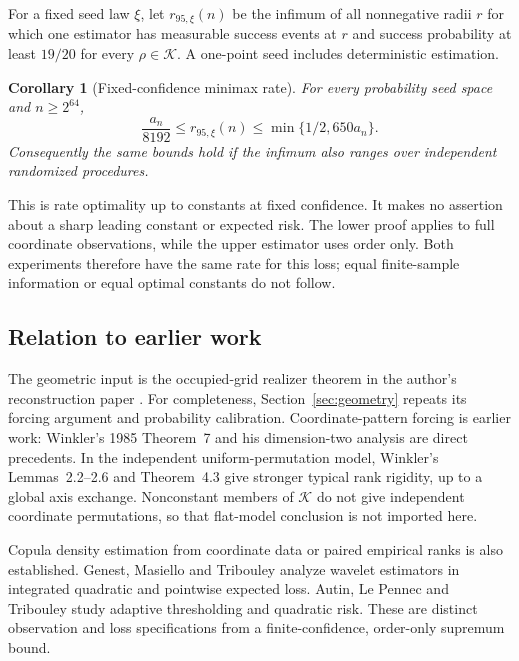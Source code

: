 \documentclass[11pt]{article}
\newtheorem{corollary}[theorem]{Corollary}
\theoremstyle{remark}
\newcommand{\K}{\mathcal K}
\begin{document}
For a fixed seed law $\xi$, let $r_{95,\xi}(n)$ be the infimum of all
nonnegative radii $r$ for which one estimator has measurable success
events at $r$ and success probability at least $19/20$ for every
$\rho\in\K$. A one-point seed includes deterministic estimation.
\begin{corollary}[Fixed-confidence minimax rate]\label{cor:minimax}
For every probability seed space and $n\ge2^{64}$,
\begin{equation}\label{eq:minimax}
 \frac{a_n}{8192}\le r_{95,\xi}(n)
 \le\min\{1/2,650a_n\}.
\end{equation}
Consequently the same bounds hold if the infimum also ranges over
independent randomized procedures.
\end{corollary}
This is rate optimality up to constants at fixed confidence. It makes
no assertion about a sharp leading constant or expected risk. The
lower proof applies to full coordinate observations, while the upper
estimator uses order only. Both experiments therefore have the same
rate for this loss; equal finite-sample information or equal optimal
constants do not follow.

\subsection{Relation to earlier work}
The geometric input is the occupied-grid realizer theorem in the
author's reconstruction paper \cite{Reconstruction}. For completeness,
Section~\ref{sec:geometry} repeats its forcing argument and probability
calibration. Coordinate-pattern forcing is earlier work: Winkler's
1985 Theorem~7 and his dimension-two analysis
\cite{Winkler1985,Winkler} are direct precedents. In the independent
uniform-permutation model, Winkler's Lemmas~2.2--2.6 and Theorem~4.3
give stronger typical rank rigidity, up to a global axis exchange.
Nonconstant members of $\K$ do not give independent coordinate
permutations, so that flat-model conclusion is not imported here.

Copula density estimation from coordinate data or paired empirical
ranks is also established. Genest, Masiello and Tribouley
\cite{Genest} analyze wavelet estimators in integrated quadratic and
pointwise expected loss. Autin, Le Pennec and Tribouley \cite{Autin}
study adaptive thresholding and quadratic risk. These are distinct
observation and loss specifications from a finite-confidence,
order-only supremum bound.
\end{document}
